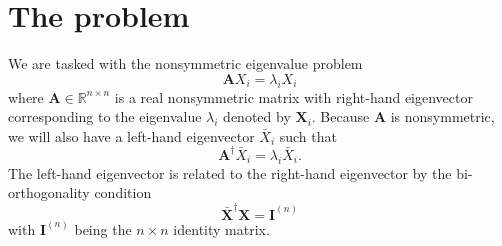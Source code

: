\section{The problem}
We are tasked with the nonsymmetric eigenvalue problem
\begin{equation}
    \mathbf{A}X_i = \lambda_i X_i
\end{equation}
where $\mathbf{A} \in \mathbb{R}^{n \times n}$ is a real nonsymmetric matrix with right-hand eigenvector corresponding to the eigenvalue $\lambda_i$ denoted by $\mathbf{X}_i$. Because $\mathbf{A}$ is nonsymmetric, we will also have a left-hand eigenvector $\bar{X}_i$ such that
\begin{equation}
    \mathbf{A}^\dag \bar{X}_i = \lambda_i \bar{X}_i.
\end{equation}
The left-hand eigenvector is related to the right-hand eigenvector by the bi-orthogonality condition
\begin{equation}
    \mathbf{\bar{X}}^\dag \mathbf{X} = \bm{I}^{(n)}
\end{equation}
with $\bm{I}^{(n)}$ being the $n \times n$ identity matrix.
